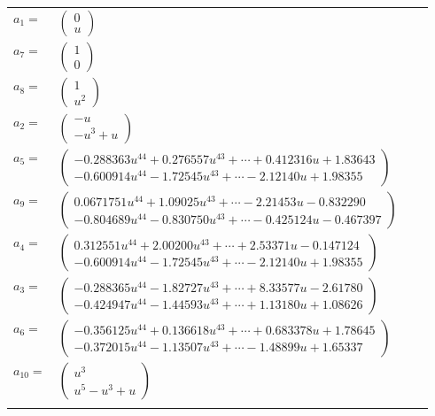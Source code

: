 \documentclass[1p]{elsarticle_modified}
\theoremstyle{definition}
\begin{document}
\begin{tabular}{m{7pt} m{180pt} m{7pt} m{180pt} }
\flushright $a_{1}=$&$\begin{pmatrix}0\\u\end{pmatrix}$ \\
\flushright $a_{7}=$&$\begin{pmatrix}1\\0\end{pmatrix}$ \\
\flushright $a_{8}=$&$\begin{pmatrix}1\\u^2\end{pmatrix}$ \\
\flushright $a_{2}=$&$\begin{pmatrix}- u\\- u^3+u\end{pmatrix}$ \\
\flushright $a_{5}=$&$\begin{pmatrix}-0.288363 u^{44}+0.276557 u^{43}+\cdots+0.412316 u+1.83643\\-0.600914 u^{44}-1.72545 u^{43}+\cdots-2.12140 u+1.98355\end{pmatrix}$ \\
\flushright $a_{9}=$&$\begin{pmatrix}0.0671751 u^{44}+1.09025 u^{43}+\cdots-2.21453 u-0.832290\\-0.804689 u^{44}-0.830750 u^{43}+\cdots-0.425124 u-0.467397\end{pmatrix}$ \\
\flushright $a_{4}=$&$\begin{pmatrix}0.312551 u^{44}+2.00200 u^{43}+\cdots+2.53371 u-0.147124\\-0.600914 u^{44}-1.72545 u^{43}+\cdots-2.12140 u+1.98355\end{pmatrix}$ \\
\flushright $a_{3}=$&$\begin{pmatrix}-0.288365 u^{44}-1.82727 u^{43}+\cdots+8.33577 u-2.61780\\-0.424947 u^{44}-1.44593 u^{43}+\cdots+1.13180 u+1.08626\end{pmatrix}$ \\
\flushright $a_{6}=$&$\begin{pmatrix}-0.356125 u^{44}+0.136618 u^{43}+\cdots+0.683378 u+1.78645\\-0.372015 u^{44}-1.13507 u^{43}+\cdots-1.48899 u+1.65337\end{pmatrix}$ \\
\flushright $a_{10}=$&$\begin{pmatrix}u^3\\u^5- u^3+u\end{pmatrix}$\\&\end{tabular}
\end{document}
